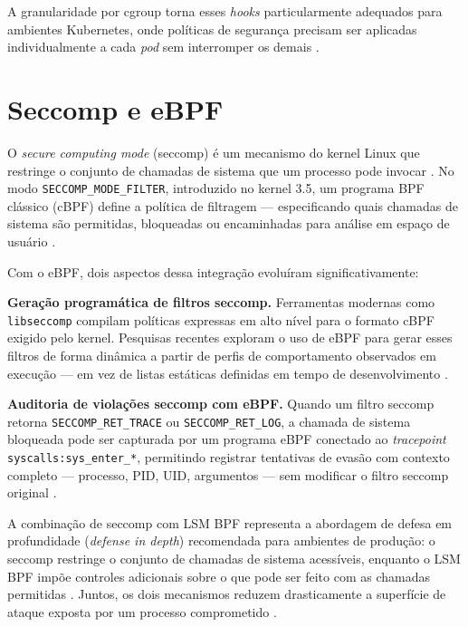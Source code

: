 A granularidade por cgroup torna esses \textit{hooks} particularmente adequados
para ambientes Kubernetes, onde políticas de segurança precisam ser aplicadas
individualmente a cada \textit{pod} sem interromper os demais
\cite{cassagnes2020}.

\section{Seccomp e eBPF}

O \textit{secure computing mode} (seccomp) é um mecanismo do kernel Linux que
restringe o conjunto de chamadas de sistema que um processo pode invocar
\cite{linuxkernel2024}.
No modo \texttt{SECCOMP\_MODE\_FILTER}, introduzido no kernel 3.5, um programa BPF
clássico (cBPF) define a política de filtragem — especificando quais chamadas de
sistema são permitidas, bloqueadas ou encaminhadas para análise em espaço de usuário
\cite{mccanne1993}.

Com o eBPF, dois aspectos dessa integração evoluíram significativamente:

\textbf{Geração programática de filtros seccomp.}
Ferramentas modernas como \texttt{libseccomp} compilam políticas expressas em alto
nível para o formato cBPF exigido pelo kernel.
Pesquisas recentes exploram o uso de eBPF para gerar esses filtros de forma
dinâmica a partir de perfis de comportamento observados em execução — em vez de
listas estáticas definidas em tempo de desenvolvimento \cite{gregg2019}.

\textbf{Auditoria de violações seccomp com eBPF.}
Quando um filtro seccomp retorna \texttt{SECCOMP\_RET\_TRACE} ou
\texttt{SECCOMP\_RET\_LOG}, a chamada de sistema bloqueada pode ser capturada por
um programa eBPF conectado ao \textit{tracepoint} \texttt{syscalls:sys\_enter\_*},
permitindo registrar tentativas de evasão com contexto completo — processo, PID,
UID, argumentos — sem modificar o filtro seccomp original \cite{linuxkernel2024}.

A combinação de seccomp com LSM BPF representa a abordagem de defesa em
profundidade (\textit{defense in depth}) recomendada para ambientes de produção:
o seccomp restringe o conjunto de chamadas de sistema acessíveis, enquanto o LSM
BPF impõe controles adicionais sobre o que pode ser feito com as chamadas
permitidas \cite{beyer2016}.
Juntos, os dois mecanismos reduzem drasticamente a superfície de ataque exposta
por um processo comprometido \cite{gregg2020}.


